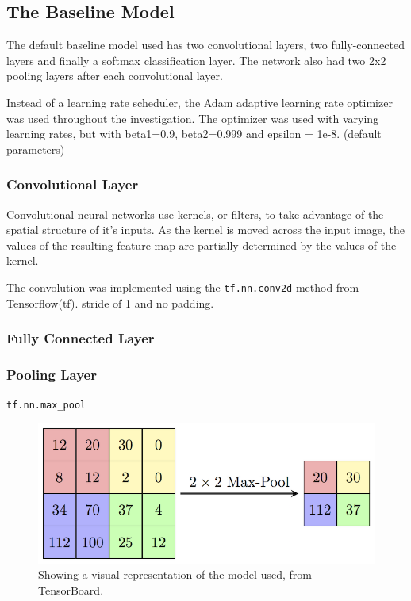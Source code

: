 \documentclass[]{article}
\begin{document}
\subsection{The Baseline Model}

The default baseline model used has two convolutional layers, two fully-connected layers and finally a softmax classification layer. The network also had two 2x2 pooling layers after each convolutional layer. 

Instead of a learning rate scheduler, the Adam adaptive learning rate optimizer was used throughout the investigation. The optimizer was used with varying learning rates, but with beta1=0.9, beta2=0.999 and epsilon = 1e-8. (default parameters) 

\subsubsection{Convolutional Layer}

Convolutional neural networks use kernels, or filters, to take advantage of the spatial structure of it’s inputs. As the kernel is moved across the input image, the values of the resulting feature map are partially determined by the values of the kernel.

The convolution was implemented using the \texttt{tf.nn.conv2d} method from Tensorflow(tf). 
stride of 1 and no padding. 
\subsubsection{Fully Connected Layer}



\subsubsection{Pooling Layer}

\texttt{tf.nn.max\_pool}

\begin{figure}[h]
	\includegraphics[width=\textwidth]{pool}
	\caption{Showing a visual representation of the model used, from TensorBoard.}
	\label{pool}
	\centering
\end{figure}
\end{document}

